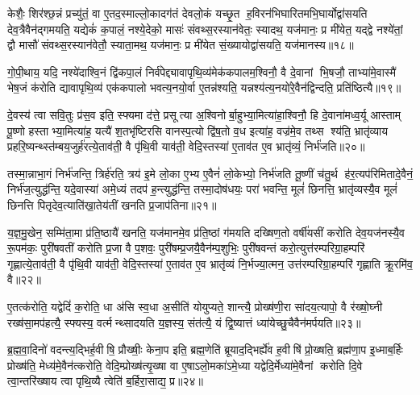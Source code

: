 केशैः॒ शिर॑श्छ॒न्नं प्रच्यु॑तं॒ वा ए॒तद॒स्माल्लो॒कादग॑तं देवलो॒कं यच्छृ॒त ह॒विरन॑भिघारितमभि॒घार्योद्वा॑सयति देव॒त्रैवैन॑द्गमयति॒ यद्येकं॑ क॒पालं॒ नश्ये॒देको॒ मासः॑ संवथ्स॒रस्यान॑वेतः॒ स्यादथ॒ यज॑मानः॒ प्र मी॑येत॒ यद्द्वे नश्ये॑तां॒ द्वौ मासौ॑ संवथ्स॒रस्यान॑वेतौ॒ स्याता॒मथ॒ यज॑मानः॒ प्र मी॑येत सं॒ख्यायोद्वा॑सयति॒ यज॑मानस्य॥१८॥

गो॒पी॒थाय॒ यदि॒ नश्ये॑दाश्वि॒नं द्वि॑कपा॒लं निर्व॑पेद्द्यावापृथि॒व्य॑मेक॑कपालम॒श्विनौ॒ वै दे॒वानां भि॒षजौ॒ ताभ्या॑मे॒वास्मै॑ भेष॒जं क॑रोति द्यावापृथि॒व्य॑ एक॑कपालो भवत्य॒नयो॒र्वा ए॒तन्न॑श्यति॒ यन्नश्य॑त्य॒नयो॑रे॒वैन॑द्विन्दति॒ प्रति॑ष्ठित्यै॥१९॥

{\anuvakamend[{प्रा॒जा॒प॒त्यन्तेऽख्षोऽनु॑पाक्तो वे॒देना॒भि वा॑सयति॒ तस्मा॒द्यज॑मानस्य॒ द्वात्रिꣳ॑शच्च॥३॥}]}

दे॒वस्य॑ त्वा सवि॒तुः प्र॑स॒व इति॒ स्फ्यमा द॑त्ते॒ प्रसूत्या अ॒श्विनोर्बा॒हुभ्या॒मित्या॑हा॒श्विनौ॒ हि दे॒वाना॑मध्व॒र्यू आस्ताम् पू॒ष्णो हस्ताभ्या॒मित्या॑ह॒ यत्यै॑ श॒तभृ॑ष्टिरसि वानस्प॒त्यो द्वि॑ष॒तो व॒ध इत्या॑ह॒ वज्र॑मे॒व तथ्स श्य॑ति॒ भ्रातृ॑व्याय प्रहरि॒ष्यन्थ्स्त॑म्बय॒जुर्\mbox{}ह॑रत्ये॒ताव॑ती॒ वै पृ॑थि॒वी याव॑ती॒ वेदि॒स्तस्या॑ ए॒ताव॑त ए॒व भ्रातृ॑व्यं॒ निर्भ॑जति॥२०॥

तस्मा॒न्नाभा॒गं निर्भ॑जन्ति॒ त्रिर्\mbox{}ह॑रति॒ त्रय॑ इ॒मे लो॒का ए॒भ्य ए॒वैनं॑ लो॒केभ्यो॒ निर्भ॑जति तू॒ष्णीं च॑तु॒र्थ ह॑र॒त्यप॑रिमितादे॒वैनं॒ निर्भ॑ज॒त्युद्ध॑न्ति॒ यदे॒वास्या॑ अमे॒ध्यं तदप॑ ह॒न्त्युद्ध॑न्ति॒ तस्मा॒दोष॑धयः॒ परा॑ भवन्ति॒ मूलं॑ छिनत्ति॒ भ्रातृ॑व्यस्यै॒व मूलं॑ छिनत्ति पितृदेव॒त्याति॑खा॒तेय॑तीं खनति प्र॒जाप॑तिना॥२१॥

य॒ज्ञ॒मु॒खेन॒ सम्मि॑ता॒मा प्र॑ति॒ष्ठायै॑ खनति॒ यज॑मानमे॒व प्र॑ति॒ष्ठां ग॑मयति दख्षिण॒तो वर्\mbox{}षी॑यसीं करोति देव॒यज॑नस्यै॒व रू॒पम॑कः॒ पुरी॑षवतीं करोति प्र॒जा वै प॒शवः॒ पुरी॑षम्प्र॒जयै॒वैन॑म्प॒शुभिः॒ पुरी॑षवन्तं करो॒त्युत्त॑रम्परिग्रा॒हम्परि॑ गृह्णात्ये॒ताव॑ती॒ वै पृ॑थि॒वी याव॑ती॒ वेदि॒स्तस्या॑ ए॒ताव॑त ए॒व भ्रातृ॑व्यं नि॒र्भज्या॒त्मन॒ उत्त॑रम्परिग्रा॒हम्परि॑ गृह्णाति क्रू॒रमि॑व॒ वै॥२२॥

ए॒तत्क॑रोति॒ यद्वेदिं॑ क॒रोति॒ धा अ॑सि स्व॒धा अ॒सीति॑ योयुप्यते॒ शान्त्यै॒ प्रोख्ष॑णी॒रा सा॑दय॒त्यापो॒ वै र॑ख्षो॒घ्नी रख्ष॑सा॒मप॑हत्यै॒ स्फ्यस्य॒ वर्त्मन्थ्सादयति य॒ज्ञस्य॒ संत॑त्यै॒ यं द्वि॒ष्यात्तं ध्या॑येच्छु॒चैवैन॑मर्पयति॥२३॥

{\anuvakamend[{भ॒ज॒ति॒ प्र॒जाप॑तिनेव॒ वै त्रय॑स्त्रिशच्च॥४॥}]}

ब्र॒ह्म॒वा॒दिनो॑ वदन्त्य॒द्भिर्\mbox{}ह॒वीषि॒ प्रौख्षीः॒ केना॒प इति॒ ब्रह्म॒णेति॑ ब्रूयाद॒द्भिर्\mbox{}ह्ये॑व ह॒वीषि॑ प्रो॒ख्षति॒ ब्रह्म॑णा॒प इ॒ध्माब॒र्\mbox{}हिः प्रोख्ष॑ति॒ मेध्य॑मे॒वैन॑त्करोति॒ वेदि॒म्प्रोख्ष॑त्यृ॒ख्षा वा ए॒षाऽलो॒मका॑ऽमे॒ध्या यद्वेदि॒र्मेध्या॑मे॒वैनां करोति दि॒वे त्वा॒न्तरि॑ख्षाय त्वा पृथि॒व्यै त्वेति॑ ब॒र्\mbox{}हिरा॒साद्य॒ प्र॥२४॥

